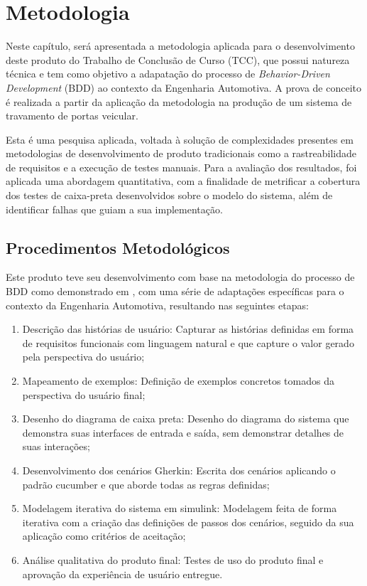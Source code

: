 \chapter{Metodologia} \label{ch:MM} %
Neste capítulo, será apresentada a metodologia aplicada para o desenvolvimento deste produto do Trabalho de Conclusão de Curso (TCC), que possui natureza técnica 
e tem como objetivo a adapatação do processo de \textit{Behavior-Driven Development} (BDD) ao contexto da Engenharia Automotiva. A prova de conceito é realizada a 
partir da aplicação da metodologia na produção de um sistema de travamento de portas veicular. 

Esta é uma pesquisa aplicada, voltada à solução de complexidades presentes em metodologias de desenvolvimento de produto tradicionais como a rastreabilidade de 
requisitos e a execução de testes manuais. Para a avaliação dos resultados, foi aplicada uma abordagem quantitativa, com a finalidade de metrificar a cobertura 
dos testes de caixa-preta desenvolvidos sobre o modelo do sistema, além de identificar falhas que guiam a sua implementação. 

\section{\textbf{Procedimentos Metodológicos}}
Este produto teve seu desenvolvimento com base na metodologia do processo de BDD como demonstrado em , com uma série de adaptações específicas 
para o contexto da Engenharia Automotiva, resultando nas seguintes etapas:
\begin{enumerate}
    \item Descrição das histórias de usuário: Capturar as histórias definidas em forma de requisitos funcionais com linguagem natural e que capture o valor 
    gerado pela perspectiva do usuário;
    \item Mapeamento de exemplos: Definição de exemplos concretos tomados da perspectiva do usuário final;
    \item Desenho do diagrama de caixa preta: Desenho do diagrama do sistema que demonstra suas interfaces de entrada e saída, sem demonstrar detalhes de suas interações;
    \item Desenvolvimento dos cenários Gherkin: Escrita dos cenários aplicando o padrão cucumber e que aborde todas as regras definidas;
    \item Modelagem iterativa do sistema em simulink: Modelagem feita de forma iterativa com a criação das definições de passos dos cenários, seguido da sua aplicação como critérios de aceitação;
    \item Análise qualitativa do produto final: Testes de uso do produto final e aprovação da experiência de usuário entregue.
\end{enumerate}

